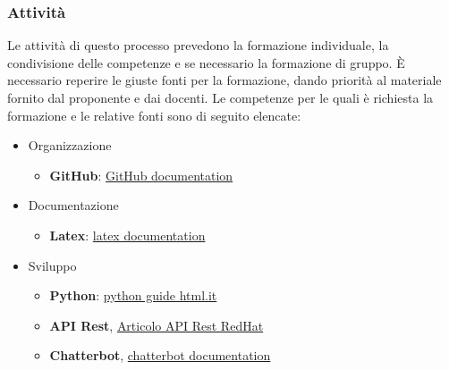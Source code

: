 \subsubsection{Attività}
Le attività di questo processo prevedono la formazione individuale, la condivisione delle competenze e se necessario la formazione di gruppo. È necessario reperire le giuste fonti per la formazione, dando priorità al materiale fornito dal proponente e dai docenti. Le competenze per le quali è richiesta la formazione e le relative fonti sono di seguito elencate:
\begin{itemize}
	\item Organizzazione
		\begin{itemize}		
			\item \textbf{GitHub}: \href{https://docs.github.com/en}{GitHub documentation}
		\end{itemize}
	\item Documentazione
		\begin{itemize}
			\item \textbf{Latex}: \href{https://www.latex-project.org/help/}{latex documentation}
		\end{itemize}
	\item Sviluppo
		\begin{itemize}
			\item \textbf{Python}: \href{https://www.html.it/guide/guida-python/}{python guide html.it}
			\item \textbf{API Rest}, \href{https://www.redhat.com/it/topics/api/what-is-a-rest-api}{Articolo API Rest RedHat}
			\item \textbf{Chatterbot}, \href{https://chatterbot.readthedocs.io/en/stable/}{chatterbot documentation}
		\end{itemize}
\end{itemize}